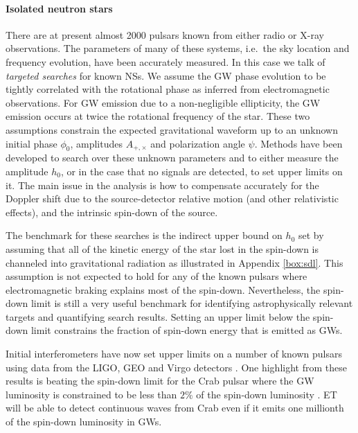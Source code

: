 %
\paragraph{Isolated neutron stars}

There are at present almost 2000 pulsars known from either radio or
X-ray observations. The parameters of many of these systems, i.e.\  the
sky location and frequency evolution, have been accurately measured. 
In this case we talk of \emph{targeted searches} for known NSs.
We assume the GW phase evolution to be tightly correlated with the
rotational phase as inferred from electromagnetic observations.  For
GW emission due to a non-negligible ellipticity, the
GW emission occurs at twice the rotational frequency of the star.
These two assumptions constrain the expected gravitational waveform
up to an unknown initial phase $\phi_0$, amplitudes $A_{+,\times}$ and
polarization angle $\psi$.  Methods have been developed to search over these
unknown parameters \cite{Jaranowski:1998qm} and to either measure the
amplitude $h_0$, or in the case that no signals are detected, to set
upper limits on it. The main issue in the analysis is how to compensate 
accurately for the Doppler shift due to the source-detector relative 
motion (and other relativistic effects), and the intrinsic spin-down of the source.

The benchmark for these searches is the indirect upper bound on $h_0$ set by
assuming that all of the kinetic energy of the star lost in the
spin-down is channeled into gravitational radiation as illustrated in Appendix 
\ref{box:sdl}. 
This assumption is not expected to hold for any of
the known pulsars where electromagnetic braking explains most of the
spin-down.  Nevertheless, the spin-down limit is still a very useful
benchmark for identifying astrophysically relevant targets and quantifying
search results. Setting an upper limit below the spin-down limit constrains
the fraction of spin-down energy that is emitted as GWs.

Initial interferometers have now set upper limits on a number of known 
pulsars using data from the LIGO, GEO and Virgo detectors
\cite{Abbott:2004ig,Abbott:2007ce, Abbott:2008fx}.  One highlight from
these results is beating the spin-down limit for the Crab pulsar
\cite{Abbott:2008fx} where the GW luminosity is
constrained to be less than $2\%$ of the spin-down luminosity
\cite{Collaboration:2009rfa}. ET will be able to detect continuous waves
from Crab even if it emits one millionth of the spin-down luminosity
in GWs.



